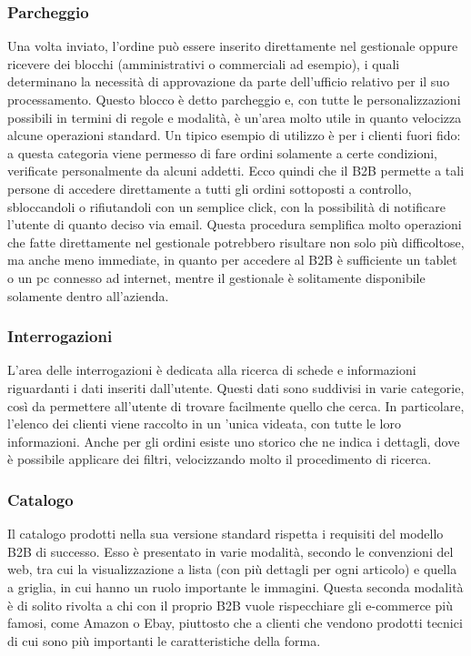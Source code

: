 \subsubsection{Parcheggio}
Una volta inviato, l'ordine può essere inserito direttamente nel gestionale oppure ricevere dei blocchi (amministrativi o commerciali ad esempio), i quali determinano la necessità di approvazione da parte dell'ufficio relativo per il suo processamento. Questo blocco è detto parcheggio e, con tutte le personalizzazioni possibili in termini di regole e modalità, è un'area molto utile in quanto velocizza alcune operazioni standard. Un tipico esempio di utilizzo è per i clienti fuori fido: a questa categoria viene permesso di fare ordini solamente a certe condizioni, verificate personalmente da alcuni addetti. Ecco quindi che il B2B permette a tali persone di accedere direttamente a tutti gli ordini sottoposti a controllo, sbloccandoli o rifiutandoli con un semplice click, con la possibilità di notificare l'utente di quanto deciso via email. Questa procedura semplifica molto operazioni che fatte direttamente nel gestionale potrebbero risultare non solo più difficoltose, ma anche meno immediate, in quanto per accedere al B2B è sufficiente un tablet o un pc connesso ad internet, mentre il gestionale è solitamente disponibile solamente dentro all'azienda.

\subsubsection{Interrogazioni}
L'area delle interrogazioni è dedicata alla ricerca di schede e informazioni riguardanti i dati inseriti dall'utente. Questi dati sono suddivisi in varie categorie, così da permettere all'utente di trovare facilmente quello che cerca. In particolare, l'elenco dei clienti viene raccolto in un 'unica videata, con tutte le loro informazioni. Anche per gli ordini esiste uno storico che ne indica i dettagli, dove è possibile applicare dei filtri, velocizzando molto il procedimento di ricerca.

\subsubsection{Catalogo}
Il catalogo prodotti nella sua versione standard rispetta i requisiti del modello B2B di successo. Esso è presentato in varie modalità, secondo le convenzioni del web, tra cui la visualizzazione a lista (con più dettagli per ogni articolo) e quella a griglia, in cui hanno un ruolo importante le immagini. Questa seconda modalità è di solito rivolta a chi con il proprio B2B vuole rispecchiare gli e-commerce più famosi, come Amazon o Ebay, piuttosto che a clienti che vendono prodotti tecnici di cui sono più importanti le caratteristiche della forma.

